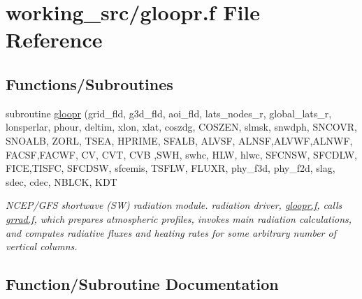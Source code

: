 \hypertarget{gloopr_8f}{}\section{working\+\_\+src/gloopr.f File Reference}
\label{gloopr_8f}
\subsection*{Functions/\+Subroutines}
\begin{DoxyCompactItemize}
\item 
subroutine \hyperlink{gloopr_8f_aa4598a23017d824c298984f4b1f14555}{gloopr} (grid\+\_\+fld, g3d\+\_\+fld, aoi\+\_\+fld,                                                                           lats\+\_\+nodes\+\_\+r, global\+\_\+lats\+\_\+r, lonsperlar, phour,                                     deltim, xlon, xlat, coszdg, C\+O\+S\+Z\+EN, slmsk, snwdph,                                         S\+N\+C\+O\+VR, S\+N\+O\+A\+LB, Z\+O\+RL, T\+S\+EA, H\+P\+R\+I\+ME, S\+F\+A\+LB,                                                       A\+L\+V\+SF, A\+L\+N\+SF,A\+L\+V\+WF,A\+L\+N\+WF, F\+A\+C\+SF,F\+A\+C\+WF, CV, C\+VT,                                     C\+VB ,S\+WH, swhc, H\+LW, hlwc, S\+F\+C\+N\+SW, S\+F\+C\+D\+LW,                                                     F\+I\+CE,T\+I\+S\+FC, S\+F\+C\+D\+SW, sfcemis,                                                                       T\+S\+F\+LW, F\+L\+U\+XR, phy\+\_\+f3d, phy\+\_\+f2d,                                                                       slag, sdec, cdec, N\+B\+L\+CK, K\+DT                                        
\begin{DoxyCompactList}\small\item\em N\+C\+E\+P/\+G\+FS shortwave (SW) radiation module. radiation driver, \hyperlink{gloopr_8f}{gloopr.\+f}, calls \hyperlink{grrad_8f}{grrad.\+f}, which prepares atmospheric profiles, invokes main radiation calculations, and computes radiative fluxes and heating rates for some arbitrary number of vertical columns. \end{DoxyCompactList}\end{DoxyCompactItemize}


\subsection{Function/\+Subroutine Documentation}
